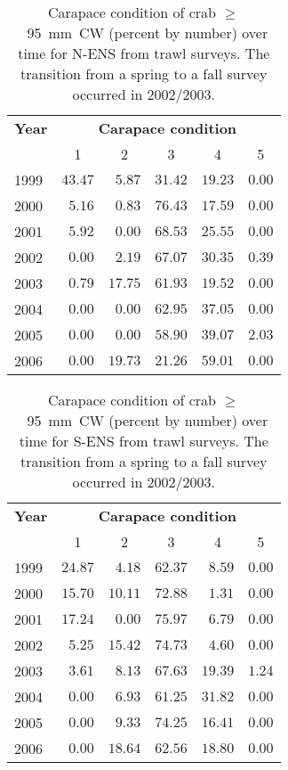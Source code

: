 \documentclass[11pt]{article}
\begin{document}
\clearpage \newpage
\begin{table}
\caption{Carapace condition of crab $\geq$~95~mm~CW (percent by number) over time for N-ENS from trawl surveys. The transition from a spring to a fall survey occurred in 2002/2003.}
\label{table.CC.north.trawl}
\begin{center}
\begin{tabular}{lrrrrr}
\hline \hline
\multicolumn{1}{l}{\bfseries Year}&
\multicolumn{5}{c}{\bfseries Carapace condition}
\\ \cline{2-6}
\multicolumn{1}{l}{}&
\multicolumn{1}{c}{1}&
\multicolumn{1}{c}{2}&
\multicolumn{1}{c}{3}&
\multicolumn{1}{c}{4}&
\multicolumn{1}{c}{5}
\\ \hline
1999&$43.47$&$ 5.87$&$31.42$&$19.23$&$0.00$\\
2000&$ 5.16$&$ 0.83$&$76.43$&$17.59$&$0.00$\\
2001&$ 5.92$&$ 0.00$&$68.53$&$25.55$&$0.00$\\
2002&$ 0.00$&$ 2.19$&$67.07$&$30.35$&$0.39$\\
2003&$ 0.79$&$17.75$&$61.93$&$19.52$&$0.00$\\
2004&$ 0.00$&$ 0.00$&$62.95$&$37.05$&$0.00$\\
2005&$ 0.00$&$ 0.00$&$58.90$&$39.07$&$2.03$\\
2006&$ 0.00$&$19.73$&$21.26$&$59.01$&$0.00$\\
\hline
\end{tabular}
\end{center}
\end{table}


\begin{table}
\caption{Carapace condition of crab $\geq$~95~mm~CW (percent by number) over time for S-ENS from trawl surveys. The transition from a spring to a fall survey occurred in 2002/2003.}
\label{table.CC.south.trawl}
\begin{center}
\begin{tabular}{lrrrrr}
\hline\hline
\multicolumn{1}{l}{\bfseries Year}&
\multicolumn{5}{c}{\bfseries Carapace condition}
\\ \cline{2-6}
\multicolumn{1}{l}{}&
\multicolumn{1}{c}{1}&
\multicolumn{1}{c}{2}&
\multicolumn{1}{c}{3}&
\multicolumn{1}{c}{4}&
\multicolumn{1}{c}{5}
\\ \hline
1999&$24.87$&$ 4.18$&$62.37$&$ 8.59$&$0.00$\\
2000&$15.70$&$10.11$&$72.88$&$ 1.31$&$0.00$\\
2001&$17.24$&$ 0.00$&$75.97$&$ 6.79$&$0.00$\\
2002&$ 5.25$&$15.42$&$74.73$&$ 4.60$&$0.00$\\
2003&$ 3.61$&$ 8.13$&$67.63$&$19.39$&$1.24$\\
2004&$ 0.00$&$ 6.93$&$61.25$&$31.82$&$0.00$\\
2005&$ 0.00$&$ 9.33$&$74.25$&$16.41$&$0.00$\\
2006&$ 0.00$&$18.64$&$62.56$&$18.80$&$0.00$\\
\hline
\end{tabular}
\end{center}
\end{table}
\end{document}
